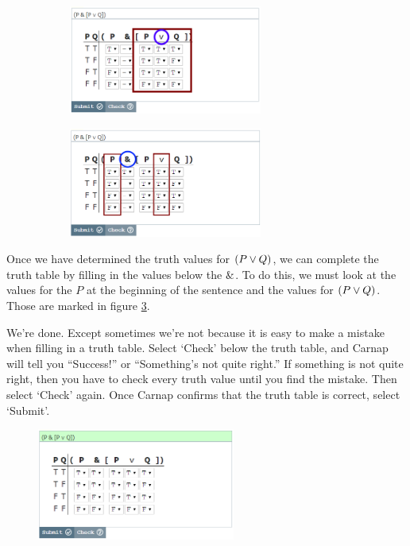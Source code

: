 \begin{figure}[b]
\begin{subfigure}[t]{0.50\textwidth}
\includegraphics[width=6.35cm]{tt-3b.png}
\subcaption{}
\label{fig:tt-3}
\end{subfigure}
\begin{subfigure}[t]{0.50\textwidth}
\includegraphics[width=6.35cm]{tt-4b.png}
\subcaption{}
\label{fig:tt-4}
\end{subfigure}
\caption{}
\end{figure} 

Once we have determined the truth values for $(P \vee Q)$, we can complete the truth table by filling in the values below the $\mathbin{\&}$. To do this, we must look at the values for the $P$ at the beginning of the sentence and the values for $(P \vee Q)$. Those are marked in figure \ref{fig:tt-4}.

We're done. Except sometimes we're not because it is easy to make a mistake when filling in a truth table. Select `Check' below the truth table, and Carnap will tell you ``Success!'' or ``Something's not quite right.'' If  something is not quite right, then you have to check every truth value until you find the mistake. Then select `Check' again. Once Carnap confirms that the truth table is correct, select `Submit'.

\begin{figure}
\centering
\includegraphics[width=6.5cm]{tt-6a.png} %
\caption{}
\label{fig:tt-6}
\end{figure}


